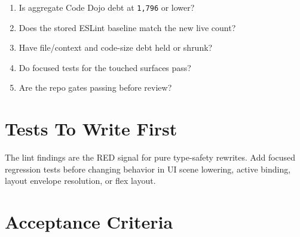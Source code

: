 \begin{enumerate}
\def\labelenumi{\arabic{enumi}.}
\tightlist
\item
  Is aggregate Code Dojo debt at \texttt{1\allowbreak{},\allowbreak{}7\allowbreak{}9\allowbreak{}6} or lower?
\item
  Does the stored ESLint baseline match the new live count?
\item
  Have file/context and code-size debt held or shrunk?
\item
  Do focused tests for the touched surfaces pass?
\item
  Are the repo gates passing before review?
\end{enumerate}

\section{Tests To Write First}\label{record-221-tests-to-write-first}

The lint findings are the RED signal for pure type-safety rewrites. Add focused regression tests before changing behavior in UI scene lowering, active binding, layout envelope resolution, or flex layout.

\section{Acceptance Criteria}\label{record-221-acceptance-criteria}

